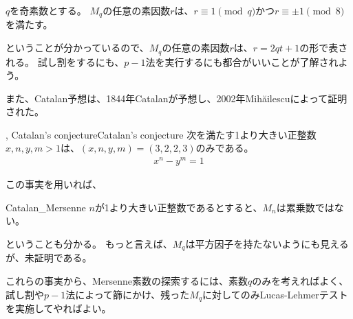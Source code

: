 \begin{Prop}{}{}
$q$を奇素数とする。
$M_q$の任意の素因数$r$は、$r\equiv1\pmod{q}$かつ$r\equiv\pm1\pmod{8}$を満たす。
\end{Prop}

ということが分かっているので、$M_q$の任意の素因数$r$は、$r=2qt+1$の形で表される。
試し割をするにも、$p-1$法を実行するにも都合がいいことが了解されよう。

また、Catalan予想は、1844年Catalanが予想し、2002年Mihăilescuによって証明された\cite{Catalan's_conjecture}。

\begin{Theo}{, Catalan's conjecture}{Catalan's conjecture}
次を満たす1より大きい正整数$x,n,y,m>1$は、$(x,n,y,m)=(3,2,2,3)$のみである。
\begin{align*}
x^n - y^m = 1
\end{align*}
\end{Theo}

この事実を用いれば、

\begin{Coro}{}{Catalan_Mersenne}
$n$が1より大きい正整数であるとすると、$M_n$は累乗数ではない。
\end{Coro}

ということも分かる。
もっと言えば、$M_q$は平方因子を持たないようにも見えるが、未証明である。

これらの事実から、Mersenne素数の探索するには、素数$q$のみを考えればよく、試し割や$p-1$法によって篩にかけ、残った$M_q$に対してのみLucas-Lehmerテストを実施してやればよい。
